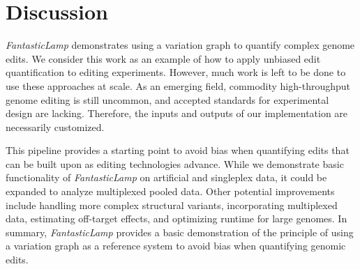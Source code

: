 \documentclass{bioinfo}
\theoremstyle{definition}
\begin{document}
\section*{Discussion}
\label{sec:discussion}
\textit{FantasticLamp} demonstrates using a variation graph to quantify complex genome edits.
We consider this work as an example of how to apply unbiased edit quantification to editing experiments.
However, much work is left to be done to use these approaches at scale.
As an emerging field, commodity high-throughput genome editing is still uncommon, and accepted standards for experimental design are lacking.
Therefore, the inputs and outputs of our implementation are necessarily customized.

This pipeline provides a starting point to avoid bias when quantifying edits that can be built upon as editing technologies advance.
While we demonstrate basic functionality of \textit{FantasticLamp} on artificial and singleplex data, it could be expanded to analyze multiplexed pooled data.
Other potential improvements include handling more complex structural variants, incorporating multiplexed data, estimating off-target effects, and optimizing runtime for large genomes.
In summary, \textit{FantasticLamp} provides a basic demonstration of the principle of using a variation graph as a reference system to avoid bias when quantifying genomic edits.

\end{document}
